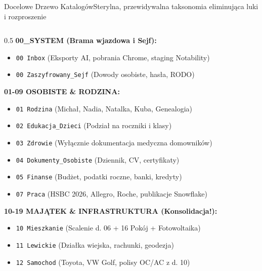 \documentclass[aspectratio=169, 10pt]{beamer}
\begin{document}
\begin{frame}{Docelowe Drzewo Katalogów}{Sterylna, przewidywalna taksonomia eliminująca luki i rozproszenie}
  \begin{columns}[T]
    \begin{column}{0.5\textwidth}
      \scriptsize
      \textbf{00\_SYSTEM (Brama wjazdowa i Sejf):}
      \begin{itemize}\tiny
        \item \texttt{00 Inbox} (Eksporty AI, pobrania Chrome, staging Notability)
        \item \texttt{00 Zaszyfrowany\_Sejf} (Dowody osobiste, hasła, RODO)
      \end{itemize}

      \textbf{01-09 OSOBISTE \& RODZINA:}
      \begin{itemize}\tiny
        \item \texttt{01 Rodzina} (Michał, Nadia, Natalka, Kuba, Genealogia)
        \item \texttt{02 Edukacja\_Dzieci} (Podział na roczniki i klasy)
        \item \texttt{03 Zdrowie} (Wyłącznie dokumentacja medyczna domowników)
        \item \texttt{04 Dokumenty\_Osobiste} (Dziennik, CV, certyfikaty)
        \item \texttt{05 Finanse} (Budżet, podatki roczne, banki, kredyty)
        \item \texttt{07 Praca} (HSBC 2026, Allegro, Roche, publikacje Snowflake)
      \end{itemize}

      \textbf{10-19 MAJĄTEK \& INFRASTRUKTURA (Konsolidacja!):}
      \begin{itemize}\tiny
        \item \texttt{10 Mieszkanie} (Scalenie d. 06 + 16 Pokój + Fotowoltaika)
        \item \texttt{11 Lewickie} (Działka wiejska, rachunki, geodezja)
        \item \texttt{12 Samochod} (Toyota, VW Golf, polisy OC/AC z d. 10)
      \end{itemize}
    \end{column}


\end{columns}
\end{frame}
\end{document}
